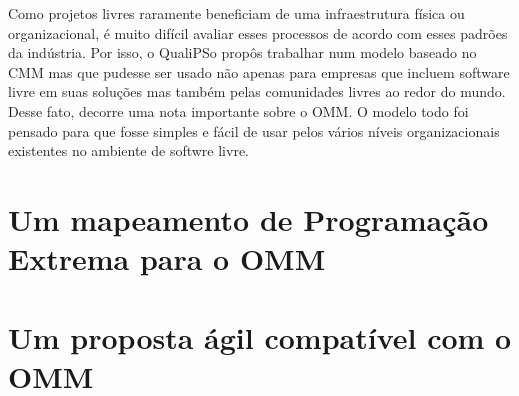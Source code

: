 Como projetos livres raramente beneficiam de uma infraestrutura física
ou organizacional, é muito difícil avaliar esses processos de acordo
com esses padrões da indústria. Por isso, o QualiPSo propôs trabalhar
num modelo baseado no CMM mas que pudesse ser usado não apenas para
empresas que incluem software livre em suas soluções mas também pelas
comunidades livres ao redor do mundo. Desse fato, decorre uma nota
importante sobre o OMM. O modelo todo foi pensado para que fosse
simples e fácil de usar pelos vários níveis organizacionais existentes
no ambiente de softwre livre.

\section{Um mapeamento de Programação Extrema para o OMM}
\label{sec:xp-em-omm}


\section{Um proposta ágil compatível com o OMM}
\label{sec:openagile-em-omm}

